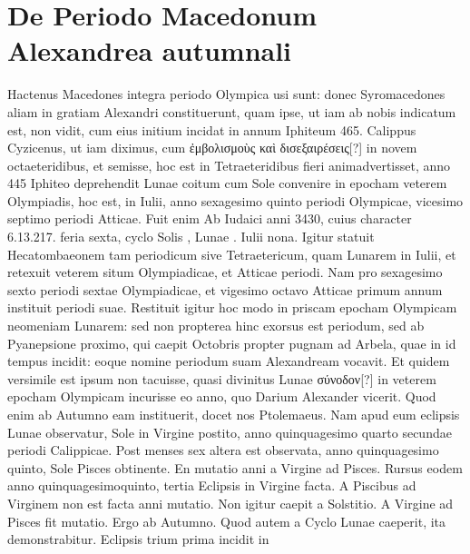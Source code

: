 \section{De Periodo Macedonum Alexandrea autumnali}
Hactenus Macedones integra periodo Olympica usi sunt: donec
Syromacedones aliam in gratiam Alexandri constituerunt,
quam ipse, ut iam ab nobis indicatum est, non vidit, cum eius initium
incidat in annum Iphiteum 465.
Calippus Cyzicenus, ut iam
diximus, cum \textgreek{ἐμβολισμοὺς καὶ δισεξαιρέσεις[?]}
 in novem octaeteridibus, et
semisse, hoc est in  Tetraeteridibus fieri animadvertisset,
 anno 445
Iphiteo deprehendit Lunae coitum cum Sole convenire in epocham
veterem Olympiadis, hoc est, in  Iulii, anno sexagesimo
 quinto periodi
Olympicae, vicesimo septimo periodi Atticae.
Fuit enim Ab Iudaici
anni 3430, cuius character 6.13.217. feria sexta, cyclo Solis ,
Lunae . Iulii nona.
%
Igitur statuit Hecatombaeonem tam periodicum
sive Tetraetericum, quam Lunarem in  Iulii, et retexuit veterem
situm Olympiadicae, et Atticae periodi.
Nam pro sexagesimo sexto periodi
sextae Olympiadicae, et vigesimo octavo Atticae primum annum
instituit periodi suae.
Restituit igitur hoc modo in priscam epocham
Olympicam neomeniam Lunarem: sed non propterea hinc exorsus
est periodum, sed ab Pyanepsione proximo, qui caepit  Octobris
propter pugnam ad Arbela, quae in id tempus incidit: eoque nomine
periodum suam Alexandream vocavit.
Et quidem versimile est ipsum
non tacuisse, quasi divinitus Lunae \textgreek{σύνοδον[?]}
 in veterem epocham Olympicam
incurisse eo anno, quo Darium Alexander vicerit.
Quod
enim ab Autumno eam instituerit, docet nos Ptolemaeus.
Nam apud
eum eclipsis Lunae observatur, Sole in Virgine postito, anno quinquagesimo
quarto secundae periodi Calippicae.
Post menses sex altera est
observata, anno quinquagesimo quinto, Sole Pisces obtinente.
En
mutatio anni a Virgine ad Pisces.
Rursus eodem anno quinquagesimoquinto,
tertia Eclipsis in Virgine facta.
A Piscibus ad Virginem
non est facta anni mutatio.
Non igitur caepit a Solstitio.
A Virgine
ad Pisces fit mutatio.
Ergo ab Autumno.
Quod autem a Cyclo Lunae
 caeperit, ita demonstrabitur.
Eclipsis trium prima incidit in
